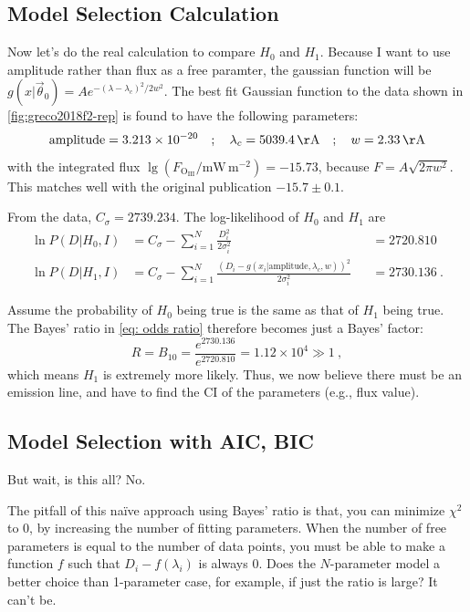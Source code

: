 \subsection{Model Selection Calculation}
Now let's do the real calculation to compare $H_0$ and $H_1$. Because I want to use amplitude rather than flux as a free paramter, the gaussian function will be $ g(x|\vec{\theta}_0) = A e^{-(\lambda - \lambda_c)^2/2w^2} $. The best fit Gaussian function to the data shown in \cref{fig:greco2018f2-rep} is found to have the following parameters:
\begin{equation}
  \mathrm{amplitude} = 3.213 \times 10^{-20}
  \quad;\quad
  \lambda_c = 5039.4 \,\mathrm{\AA}
  \quad;\quad
  w = 2.33 \,\mathrm{\AA}
\end{equation}
with the integrated flux $ \lg (F_\mathrm{O_{III}} / \mathrm{mW\, m^{-2}}) = -15.73 $, because $ F = A \sqrt{2\pi w^2} $. This matches well with the original publication $ -15.7 \pm 0.1 $. 

From the data, $ C_\sigma = 2739.234 $. The log-likelihood of $ H_0 $ and $ H_1 $ are
\begin{align*}
  \ln P(D|H_0, I)
    &= C_\sigma
      - \sum_{i=1}^{N} \frac{D_i^2}{2 \sigma_i^2}
    &&= 2720.810 \\
  \ln P(D|H_1, I)
    &= C_\sigma
      - \sum_{i=1}^{N} \frac{(D_i - g(x_i|\mathrm{amplitude}, \lambda_c, w))^2}{2 \sigma_i^2} 
    &&= 2730.136 ~.
\end{align*}

Assume the probability of $ H_0 $ being true is the same as that of $ H_1 $ being true. The  Bayes' ratio in \cref{eq: odds ratio} therefore becomes just a Bayes' factor:
\begin{equation}
  R = B_{10} = \frac{e^{2730.136}}{e^{2720.810}} = 1.12 \times 10^{4} \gg 1 ~,
\end{equation}
which means $ H_1 $ is extremely more likely. Thus, we now believe there must be an emission line, and have to find the CI of the parameters (e.g., flux value). 


\subsection{Model Selection with AIC, BIC}
But wait, is this all? No.

The pitfall of this na\"{i}ve approach using Bayes' ratio is that, you can minimize $ \chi^2 $ to 0, by increasing the number of fitting parameters. When the number of free parameters is equal to the number of data points, you must be able to make a function $ f $ such that $ D_i - f(\lambda_i) $ is always 0. Does the $ N $-parameter model a better choice than 1-parameter case, for example, if just the ratio is large? It can't be.

